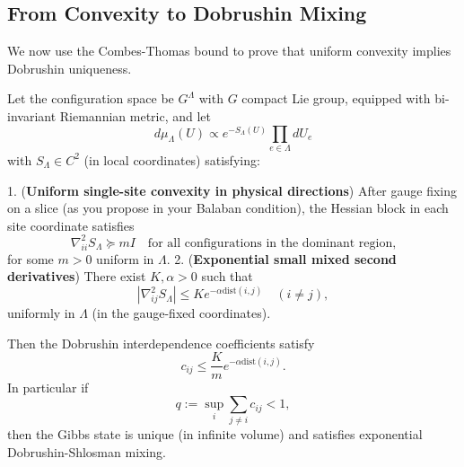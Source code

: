 \subsection{From Convexity to Dobrushin Mixing}

We now use the Combes-Thomas bound to prove that uniform convexity implies Dobrushin uniqueness.

\begin{theorem}
\label{thm:convexity-dobrushin-app165}
Let the configuration space be $G^\Lambda$ with $G$ compact Lie group, equipped with bi-invariant Riemannian metric, and let
\[
d\mu_\Lambda(U) \propto e^{-S_\Lambda(U)} \prod_{e\in\Lambda} dU_e
\]
with $S_\Lambda \in C^2$ (in local coordinates) satisfying:

1. (\textbf{Uniform single-site convexity in physical directions}) After gauge fixing on a slice (as you propose in your Balaban condition), the Hessian block in each site coordinate satisfies
   \[
   \nabla^2_{i i} S_\Lambda \succeq m I
   \quad\text{for all configurations in the dominant region,}
   \]
   for some $m > 0$ uniform in $\Lambda$.
2. (\textbf{Exponential small mixed second derivatives}) There exist $K, \alpha > 0$ such that
   \[
   |\nabla^2_{i j} S_\Lambda| \le K e^{-\alpha \mathrm{dist}(i,j)} \quad(i\ne j),
   \]
   uniformly in $\Lambda$ (in the gauge-fixed coordinates).

Then the Dobrushin interdependence coefficients satisfy
\[
c_{ij} \le \frac{K}{m} e^{-\alpha \mathrm{dist}(i,j)}.
\]
In particular if
\[
q := \sup_i \sum_{j\ne i} c_{ij} < 1,
\]
then the Gibbs state is unique (in infinite volume) and satisfies exponential Dobrushin-Shlosman mixing.
\end{theorem}

